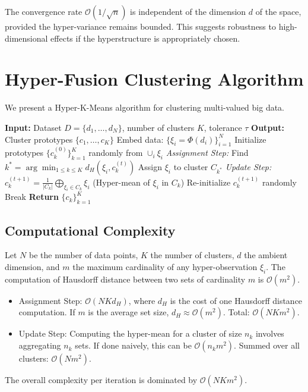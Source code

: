 \documentclass[twoside]{article}
\begin{document}
\begin{cor}
The convergence rate $\mathcal{O}(1/\sqrt{n})$ is independent of the dimension $d$ of the space, provided the hyper-variance remains bounded. This suggests robustness to high-dimensional effects if the hyperstructure is appropriately chosen.
\end{cor}

\section{Hyper-Fusion Clustering Algorithm}
We present a Hyper-K-Means algorithm for clustering multi-valued big data.

\begin{algorithm}[t]
\caption{Hyper-K-Means Clustering}
\label{alg:hyper_kmeans}
\begin{algorithmic}[1]
\STATE \textbf{Input:} Dataset $D=\{d_1,\dots,d_N\}$, number of clusters $K$, tolerance $\tau$
\STATE \textbf{Output:} Cluster prototypes $\{c_1,\dots,c_K\}$
\STATE Embed data: $\{\xi_i = \Phi(d_i)\}_{i=1}^N$
\STATE Initialize prototypes $\{c_k^{(0)}\}_{k=1}^K$ randomly from $\cup_i \xi_i$
    \STATE \textit{Assignment Step:}
        \STATE Find $k^* = \arg\min_{1\le k\le K} d_H(\xi_i, c_k^{(t)})$
        \STATE Assign $\xi_i$ to cluster $C_{k^*}$
    \ENDFOR
    \STATE \textit{Update Step:}
            \STATE $c_k^{(t+1)} = \frac{1}{|C_k|}\bigoplus_{\xi_i \in C_k} \xi_i$ (Hyper-mean of $\xi_i$ in $C_k$)
        \ELSE
            \STATE Re-initialize $c_k^{(t+1)}$ randomly
        \ENDIF
    \ENDFOR
        \STATE Break
    \ENDIF
\ENDFOR
\STATE \textbf{Return} $\{c_k\}_{k=1}^K$
\end{algorithmic}
\end{algorithm}

\subsection{Computational Complexity}
Let $N$ be the number of data points, $K$ the number of clusters, $d$ the ambient dimension, and $m$ the maximum cardinality of any hyper-observation $\xi_i$.
The computation of Hausdorff distance between two sets of cardinality $m$ is $\mathcal{O}(m^2)$.
\begin{itemize}
    \item Assignment Step: $\mathcal{O}(N K d_H)$, where $d_H$ is the cost of one Hausdorff distance computation. If $m$ is the average set size, $d_H \approx \mathcal{O}(m^2)$. Total: $\mathcal{O}(N K m^2)$.
    \item Update Step: Computing the hyper-mean for a cluster of size $n_k$ involves aggregating $n_k$ sets. If done naively, this can be $\mathcal{O}(n_k m^2)$. Summed over all clusters: $\mathcal{O}(N m^2)$.
\end{itemize}
The overall complexity per iteration is dominated by $\mathcal{O}(N K m^2)$.
\end{document}
